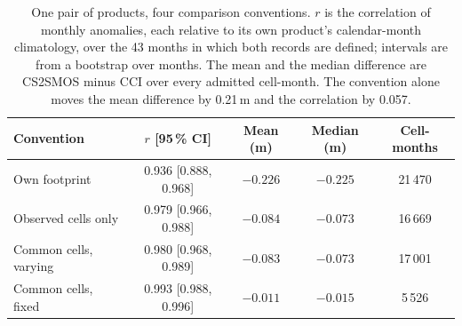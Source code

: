 ﻿\begin{table}[htbp]
\centering
\caption{One pair of products, four comparison conventions. $r$ is the
correlation of monthly anomalies, each relative to its own product's
calendar-month climatology, over the 43 months in which both records are
defined; intervals are from a bootstrap over months. The mean and the median
difference are CS2SMOS minus CCI over every admitted cell-month. The convention
alone moves the mean difference by 0.21\,m and the correlation by 0.057.}
\label{tab:comparison}
\footnotesize
\setlength{\tabcolsep}{3pt}
\begin{tabular}{lcccc}
\toprule
Convention & $r$ [95\,\% CI] & Mean (m) & Median (m) & Cell-months \\
\midrule
Own footprint & 0.936 [0.888, 0.968] & $-0.226$ & $-0.225$ & 21\,470 \\
Observed cells only & 0.979 [0.966, 0.988] & $-0.084$ & $-0.073$ & 16\,669 \\
Common cells, varying & 0.980 [0.968, 0.989] & $-0.083$ & $-0.073$ & 17\,001 \\
Common cells, fixed & 0.993 [0.988, 0.996] & $-0.011$ & $-0.015$ & 5\,526 \\
\bottomrule
\end{tabular}
\end{table}
